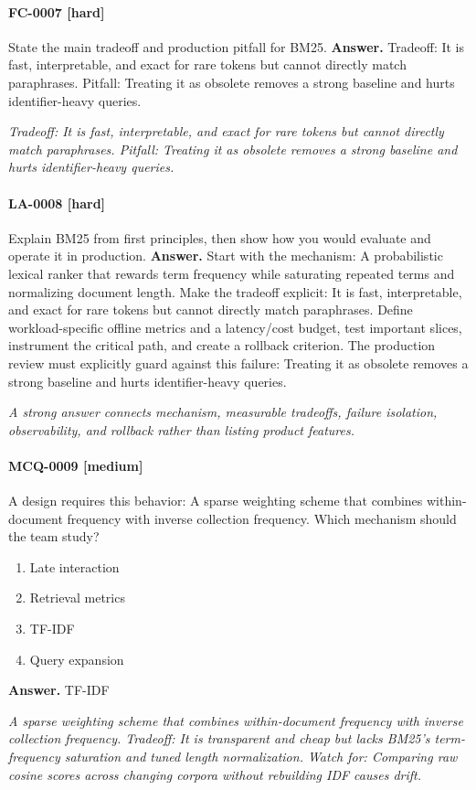 \paragraph{FC-0007 [hard]} State the main tradeoff and production pitfall for BM25.
\noindent\textbf{Answer.} Tradeoff: It is fast, interpretable, and exact for rare tokens but cannot directly match paraphrases. Pitfall: Treating it as obsolete removes a strong baseline and hurts identifier-heavy queries.
\par\textit{Tradeoff: It is fast, interpretable, and exact for rare tokens but cannot directly match paraphrases. Pitfall: Treating it as obsolete removes a strong baseline and hurts identifier-heavy queries.}
\paragraph{LA-0008 [hard]} Explain BM25 from first principles, then show how you would evaluate and operate it in production.
\noindent\textbf{Answer.} Start with the mechanism: A probabilistic lexical ranker that rewards term frequency while saturating repeated terms and normalizing document length. Make the tradeoff explicit: It is fast, interpretable, and exact for rare tokens but cannot directly match paraphrases. Define workload-specific offline metrics and a latency/cost budget, test important slices, instrument the critical path, and create a rollback criterion. The production review must explicitly guard against this failure: Treating it as obsolete removes a strong baseline and hurts identifier-heavy queries.
\par\textit{A strong answer connects mechanism, measurable tradeoffs, failure isolation, observability, and rollback rather than listing product features.}
\paragraph{MCQ-0009 [medium]} A design requires this behavior: A sparse weighting scheme that combines within-document frequency with inverse collection frequency. Which mechanism should the team study?
\begin{enumerate}[label=\Alph*.]
\item Late interaction
\item Retrieval metrics
\item TF-IDF
\item Query expansion
\end{enumerate}
\noindent\textbf{Answer.} TF-IDF
\par\textit{A sparse weighting scheme that combines within-document frequency with inverse collection frequency. Tradeoff: It is transparent and cheap but lacks BM25's term-frequency saturation and tuned length normalization. Watch for: Comparing raw cosine scores across changing corpora without rebuilding IDF causes drift.}
